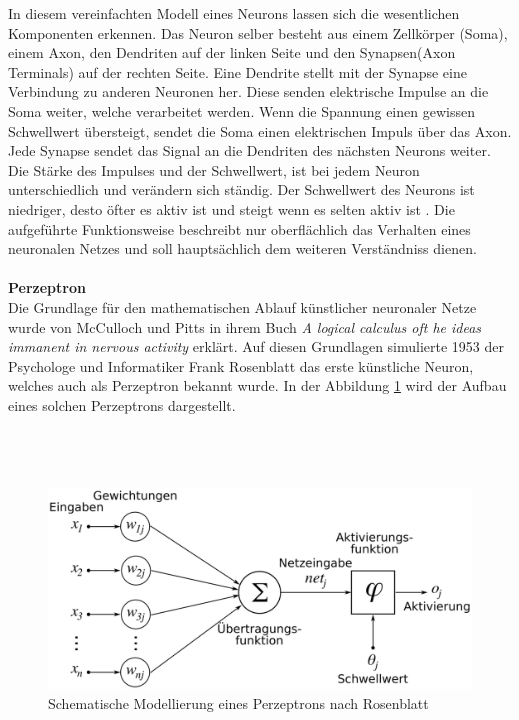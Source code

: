 In diesem vereinfachten Modell eines Neurons lassen sich die wesentlichen Komponenten erkennen. Das Neuron selber besteht aus einem Zellkörper (Soma), einem Axon, den Dendriten auf der linken Seite und den Synapsen(Axon Terminals) auf der rechten Seite. Eine Dendrite stellt mit der Synapse eine Verbindung zu anderen Neuronen her. Diese senden elektrische Impulse an die Soma weiter, welche verarbeitet werden. Wenn die Spannung einen gewissen Schwellwert übersteigt, sendet die Soma einen elektrischen Impuls über das Axon. Jede Synapse sendet das Signal an die Dendriten des nächsten Neurons weiter. Die Stärke des Impulses und der Schwellwert, ist bei jedem Neuron unterschiedlich und verändern sich ständig. Der Schwellwert des Neurons ist niedriger, desto öfter es aktiv ist und steigt wenn es selten aktiv ist \cite{schmidt2013physiologie}. Die aufgeführte Funktionsweise beschreibt nur oberflächlich das Verhalten eines neuronalen Netzes und soll hauptsächlich dem weiteren Verständniss dienen.\\\\
\textbf{Perzeptron}\\
Die Grundlage für den mathematischen Ablauf künstlicher neuronaler Netze wurde von McCulloch und Pitts in ihrem Buch \textit{A logical calculus oft he ideas immanent in nervous activity} erklärt. Auf diesen Grundlagen simulierte 1953 der Psychologe und Informatiker Frank Rosenblatt das erste künstliche Neuron, welches auch als Perzeptron bekannt wurde. In der Abbildung \ref{img:Perzeptron} wird der Aufbau eines solchen Perzeptrons dargestellt.\\\\\\\\
\begin{figure}
	[h]
	\centering
	\includegraphics[scale=0.3]{Sources/perzeptron2.png}
	\caption{Schematische Modellierung eines Perzeptrons nach Rosenblatt \cite{perzeptron2019}}
	\label{img:Perzeptron}
\end{figure}\\
